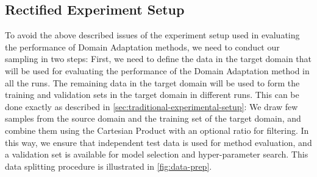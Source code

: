 \documentclass[journal]{IEEEtran}
\begin{document}
\subsection{Rectified Experiment Setup}\label{sec:rectified-experimental-setup}
To avoid the above described issues of the experiment setup used in evaluating the performance of Domain Adaptation methods, we need to conduct our sampling in two steps: First, we need to define the data in the target domain that will be used for evaluating the performance of the Domain Adaptation method in all the runs. The remaining data in the target domain will be used to form the training and validation sets in the target domain in different runs. This can be done exactly as described in \cref{sec:traditional-experimental-setup}: We draw few samples from the source domain and the training set of the target domain, and combine them using the Cartesian Product with an optional ratio for filtering. In this way, we ensure that independent test data is used for method evaluation, and a validation set is available for model selection and hyper-parameter search. This data splitting procedure is illustrated in \cref{fig:data-prep}.
\end{document}
